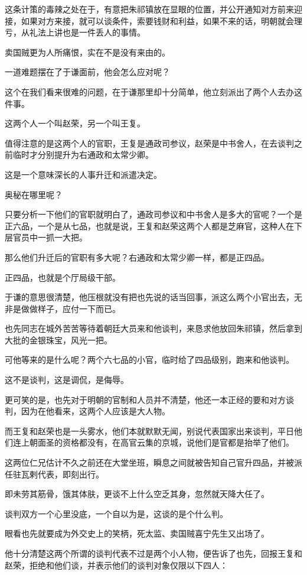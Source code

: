 \begin{multicols}{\theparacolNo}
这条计策的毒辣之处在于，有意把朱祁镇放在显眼的位置，并公开通知对方前来迎接，如果对方来接，就可以谈条件，索要钱财和利益，如果不来的话，明朝就会理亏，从礼法上讲也是一件丢人的事情。

卖国贼更为人所痛恨，实在不是没有来由的。

一道难题摆在了于谦面前，他会怎么应对呢？

这个在我们看来很难的问题，在于谦那里却十分简单，他立刻派出了两个人去办这件事。

这两个人一个叫赵荣，另一个叫王复。

值得注意的是这两个人的官职，王复是通政司参议，赵荣是中书舍人，在去谈判之前临时才分别提升为右通政和太常少卿。

这是一个意味深长的人事升迁和派遣决定。

奥秘在哪里呢？

只要分析一下他们的官职就明白了，通政司参议和中书舍人是多大的官呢？一个是正六品，一个是从七品，也就是说，王复和赵荣这两个人都是芝麻官，这种人在下层官员中一抓一大把。

那么他们升迁后的官职有多大呢？右通政和太常少卿一样，都是正四品。

正四品，也就是个厅局级干部。

于谦的意思很清楚，他压根就没有把也先说的话当回事，派这么两个小官出去，无非是做做样子，应付一下而已。

也先同志在城外苦苦等待着朝廷大员来和他谈判，来恳求他放回朱祁镇，然后拿到大批的金银珠宝，风光一把。

可他等来的是什么呢？两个六七品的小官，临时给了四品级别，跑来和他谈判。

这不是谈判，这是调侃，是侮辱。

更可笑的是，也先对于明朝的官制和人员并不清楚，他还一本正经的要和对方谈判，因为在他看来，这两个人应该是大人物。

而王复和赵荣也是一头雾水，他们本就默默无闻，别说代表国家出来谈判，平日他们连上朝面圣的资格都没有，在高官云集的京城，说他们是官都是抬举了他们。

这两位仁兄估计不久之前还在大堂坐班，瞬息之间就被告知自己官升四品，并被派任驻瓦剌代表，即刻出行。

即未劳其筋骨，饿其体肤，更谈不上什么空乏其身，忽然就天降大任了。

谈判双方一个心里没底，一个自以为是，这谈的是个什么判。

眼看也先就要成为外交史上的笑柄，死太监、卖国贼喜宁先生又出场了。

他十分清楚这两个所谓的谈判代表不过是两个小人物，便告诉了也先，回报王复和赵荣，拒绝和他们谈，并表示他们的谈判对象仅限以下四人：


\end{multicols}

